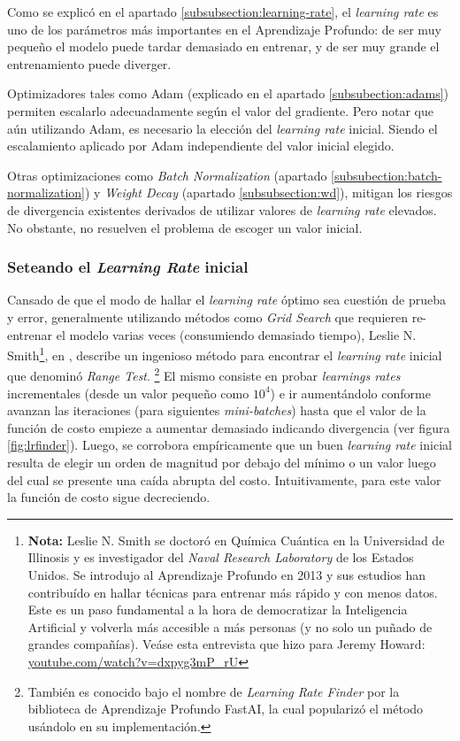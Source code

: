Como se explicó en el apartado \ref{subsubsection:learning-rate}, el \textit{learning rate} es uno de los parámetros más importantes en el Aprendizaje Profundo: de ser muy pequeño el modelo puede tardar demasiado en entrenar, y de ser muy grande el entrenamiento puede diverger.

Optimizadores tales como Adam (explicado en el apartado \ref{subsubection:adams}) permiten escalarlo adecuadamente según el valor del gradiente. Pero notar que aún utilizando Adam, es necesario la elección del \textit{learning rate} inicial. Siendo el escalamiento aplicado por Adam independiente del valor inicial elegido.

Otras optimizaciones como \textit{Batch Normalization} (apartado \ref{subsubection:batch-normalization}) y \textit{Weight Decay} (apartado \ref{subsubsection:wd}), mitigan los riesgos de divergencia existentes derivados de utilizar valores de \textit{learning rate} elevados. No obstante, no resuelven el problema de escoger un valor inicial.

\subsubsection{Seteando el \textit{Learning Rate} inicial}

Cansado de que el modo de hallar el \textit{learning rate} óptimo sea cuestión de prueba y error, generalmente utilizando métodos como \textit{Grid Search} que requieren re-entrenar el modelo varias veces (consumiendo demasiado tiempo), Leslie N. Smith\footnote{\textbf{Nota:} Leslie N. Smith se doctoró en Química Cuántica en la Universidad de Illinosis y es investigador del \textit{Naval Research Laboratory} de los Estados Unidos. Se introdujo al Aprendizaje Profundo en 2013 y sus estudios han contribuído en hallar técnicas para entrenar más rápido y con menos datos. Este es un paso fundamental a la hora de democratizar la Inteligencia Artificial y volverla más accesible a más personas (y no solo un puñado de grandes compañías). Veáse esta entrevista que hizo para Jeremy Howard: \url{youtube.com/watch?v=dxpyg3mP_rU}}, en \cite{lr-finder}, describe un ingenioso método para encontrar el \textit{learning rate} inicial que denominó \textit{Range Test}. \footnote{También es conocido bajo el nombre de \textit{Learning Rate Finder} por la biblioteca de Aprendizaje Profundo FastAI, la cual popularizó el método usándolo en su implementación. }
El mismo consiste en probar \textit{learnings rates} incrementales (desde un valor pequeño como $10^4$) e ir aumentándolo conforme avanzan las iteraciones (para siguientes \textit{mini-batches}) hasta que el valor de la función de costo empieze a aumentar demasiado indicando divergencia (ver figura \ref{fig:lrfinder}). Luego, se corrobora empíricamente que un buen \textit{learning rate} inicial resulta de elegir un orden de magnitud por debajo del mínimo o un valor luego del cual se presente una caída abrupta del costo. Intuitivamente, para este valor la función de costo sigue decreciendo.

